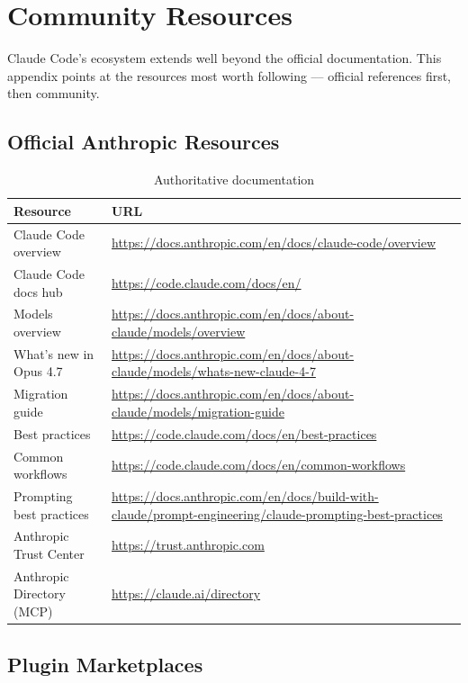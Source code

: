 \chapter{Community Resources}
\label{app:community}

Claude Code's ecosystem extends well beyond the official documentation.
This appendix points at the resources most worth following — official
references first, then community.

\section{Official Anthropic Resources}
\label{app:official}

\begin{table}[ht]
\centering
\caption{Authoritative documentation}
\label{tab:app-official}
\begin{tabularx}{\textwidth}{lX}
\toprule
\textbf{Resource} & \textbf{URL} \\
\midrule
Claude Code overview      & \url{https://docs.anthropic.com/en/docs/claude-code/overview} \\
Claude Code docs hub      & \url{https://code.claude.com/docs/en/} \\
Models overview           & \url{https://docs.anthropic.com/en/docs/about-claude/models/overview} \\
What's new in Opus 4.7    & \url{https://docs.anthropic.com/en/docs/about-claude/models/whats-new-claude-4-7} \\
Migration guide           & \url{https://docs.anthropic.com/en/docs/about-claude/models/migration-guide} \\
Best practices            & \url{https://code.claude.com/docs/en/best-practices} \\
Common workflows          & \url{https://code.claude.com/docs/en/common-workflows} \\
Prompting best practices  & \url{https://docs.anthropic.com/en/docs/build-with-claude/prompt-engineering/claude-prompting-best-practices} \\
Anthropic Trust Center    & \url{https://trust.anthropic.com} \\
Anthropic Directory (MCP) & \url{https://claude.ai/directory} \\
\bottomrule
\end{tabularx}
\end{table}

\section{Plugin Marketplaces}
\label{app:marketplaces}

